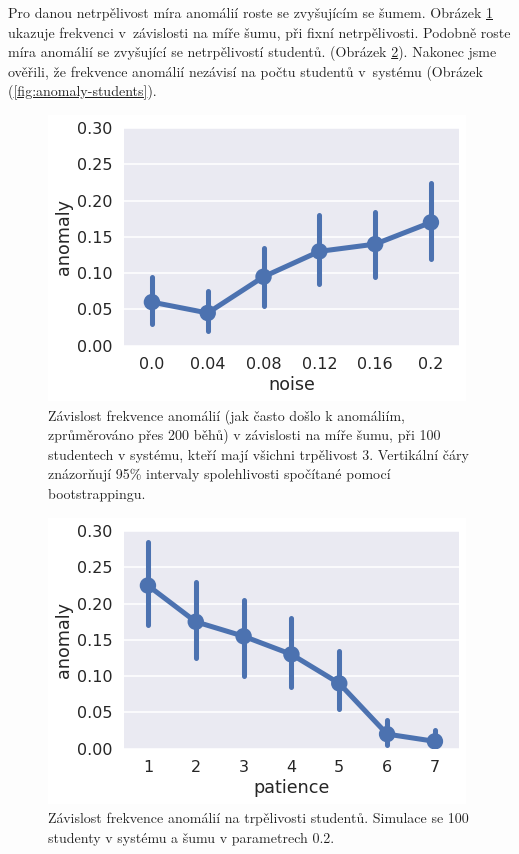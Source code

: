 \documentclass[twocolumn,10pt,cleanfoot]{asme2ej}
\begin{document}
Pro danou netrpělivost míra anomálií roste se zvyšujícím se šumem.
Obrázek \ref{fig:anomaly-noise} ukazuje frekvenci v~závislosti na míře šumu, při fixní netrpělivosti.
Podobně roste míra anomálií se zvyšující se netrpělivostí studentů.
(Obrázek \ref{fig:anomaly-patience}).
Nakonec jsme ověřili, že frekvence anomálií nezávisí na počtu studentů v~systému
(Obrázek (\ref{fig:anomaly-students}).

\begin{figure}[htb]
\centering
\includegraphics[width=\columnwidth]{img/anomaly-noise}
\caption{Závislost frekvence anomálií (jak často došlo k anomáliím, zprůměrováno přes 200 běhů) v závislosti na míře šumu, při 100 studentech v systému, kteří mají všichni trpělivost 3. Vertikální čáry znázorňují 95\% intervaly spolehlivosti spočítané pomocí bootstrappingu.}
\label{fig:anomaly-noise}
\end{figure}


\begin{figure}[htb]
\centering
\includegraphics[width=\columnwidth]{img/anomaly-patience}
\caption{%
  Závislost frekvence anomálií na trpělivosti studentů.
  Simulace se 100 studenty v systému a šumu v parametrech 0.2.}
\label{fig:anomaly-patience}
\end{figure}
\end{document}
